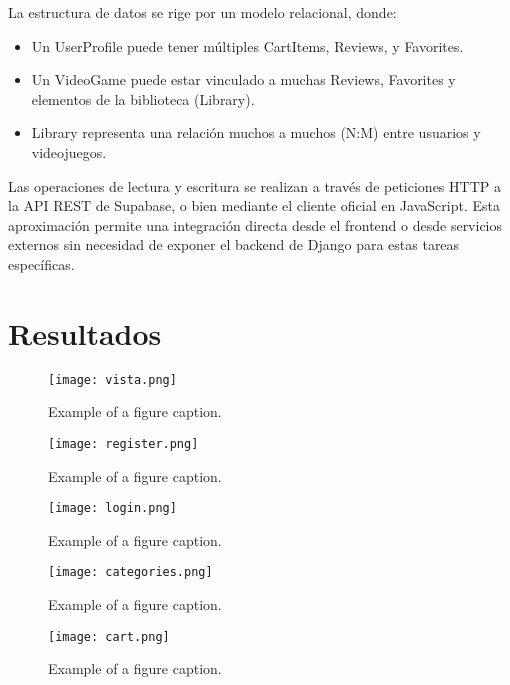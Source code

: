 \documentclass[conference]{IEEEtran}
\begin{document}
La estructura de datos se rige por un modelo relacional, donde:
\begin{itemize}
	\item Un UserProfile puede tener múltiples CartItems, Reviews, y Favorites.
	\item Un VideoGame puede estar vinculado a muchas Reviews, Favorites y elementos de la biblioteca (Library).
	\item Library representa una relación muchos a muchos (N:M) entre usuarios y videojuegos.
\end{itemize}

Las operaciones de lectura y escritura se realizan a través de peticiones HTTP a la API REST de Supabase, o bien mediante el cliente oficial en JavaScript. Esta aproximación permite una integración directa desde el frontend o desde servicios externos sin necesidad de exponer el backend de Django para estas tareas específicas.


\section{Resultados}

\begin{figure}[htbp]
	\centerline{\texttt{[image: vista.png]}}
	\caption{Example of a figure caption.}
	\label{fig}
\end{figure}

\begin{figure}[htbp]
	\centerline{\texttt{[image: register.png]}}
	\caption{Example of a figure caption.}
	\label{fig}
\end{figure}

\begin{figure}[htbp]
	\centerline{\texttt{[image: login.png]}}
	\caption{Example of a figure caption.}
	\label{fig}
\end{figure}

\begin{figure}[htbp]
	\centerline{\texttt{[image: categories.png]}}
	\caption{Example of a figure caption.}
	\label{fig}
\end{figure}

\begin{figure}[htbp]
	\centerline{\texttt{[image: cart.png]}}
	\caption{Example of a figure caption.}
	\label{fig}
\end{figure}
\end{document}
